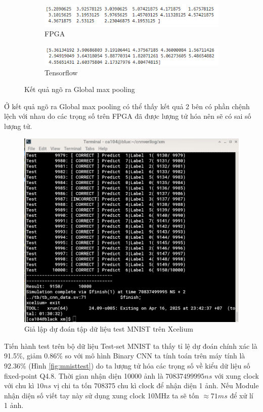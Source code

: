 \begin{figure}[H]
  \centering
    \begin{subfigure}[b]{\textwidth}
        \centering
        \includegraphics[width=0.75\linewidth]{Images/fpgagm.png}
        \caption{FPGA}
        \label{fig:enter-label}
    \end{subfigure}
    \vspace{1em} %
    \begin{subfigure}[b]{\textwidth}
        \centering
        \includegraphics[width=0.75\linewidth]{Images/cnngm.png}
        \caption{Tensorflow}
        \label{fig:enter-label}
    \end{subfigure}
    \caption{Kết quả ngõ ra Global max pooling}
\end{figure}
Ở kết quả ngõ ra Global max pooling có thể thấy kết quả 2 bên có phần chệnh lệch với nhau do các trọng số trên FPGA đã được lượng tử hóa nên sẽ có sai số lượng tử.

\begin{figure}[H]
    \centering
    \includegraphics[width=0.75\linewidth]{Images/Screenshot 2025-04-16 192852.png}
    \caption{Giả lập dự đoán tập dữ liệu test MNIST trên Xcelium}
    \label{fig:enter-label}
\end{figure}
Tiến hành test trên bộ dữ liệu Test-set MNIST ta thấy tỉ lệ dự đoán chính xác là 91.5\%, giảm 0.86\% so với mô hình Binary CNN ta tính toán trên máy tính là 92.36\% (Hình \ref{fig:mnisttest}) do ta lượng tử hóa các trọng số về kiểu dữ liệu số fixed-point Q4.8. Thời gian nhận diện 10000 ảnh là $70837499995ns$ với xung clock với chu kì $10ns$ vị chi ta tốn 708375 chu kì clock để nhận diện 1 ảnh. Nếu Module nhận diện số viết tay này sử dụng xung clock 10MHz ta sẽ tốn $\approx71ms$ để xử lí 1 ảnh.


